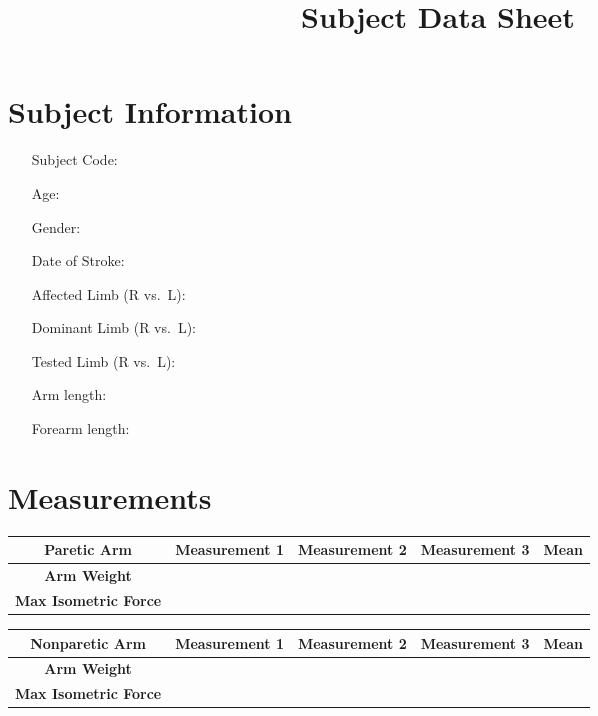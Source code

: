 \documentclass[11pt]{article}
\begin{document}
\title{Subject Data Sheet}

\maketitle
\section*{Subject Information}
\begin{itemize}[leftmargin=2in]
\item[Subject Code:]
\item[Age:]
\item[Gender:]
\item[Date of Stroke:]
\item[Affected Limb (R vs.\ L):]
\item[Dominant Limb (R vs.\ L):]
\item[Tested Limb (R vs.\ L):]
\item[Arm length:]
\item[Forearm length:]

\end{itemize}
\section*{Measurements}

\begin{table}[!h]
\centering
\begin{tabular}{c | c | c | c | c}
\textbf{Paretic Arm} &\textbf{Measurement 1} & \textbf{Measurement 2} & \textbf{Measurement 3} & \textbf{Mean} \\
\hline
\multirow{2}{*}{\textbf{Arm Weight}}& & & &\\
& & &\\
\hline
\multirow{2}{*}{\textbf{Max Isometric Force}}& & & &\\
& & &
\end{tabular}
\end{table}


\begin{table}[!h]
\centering
\begin{tabular}{c | c | c | c | c}
\textbf{Nonparetic Arm} &\textbf{Measurement 1} & \textbf{Measurement 2} & \textbf{Measurement 3} & \textbf{Mean} \\
\hline
\multirow{2}{*}{\textbf{Arm Weight}}& & & &\\
& & &\\
\hline
\multirow{2}{*}{\textbf{Max Isometric Force}}& & & &\\
& & &
\end{tabular}
\end{table}
\end{document}
